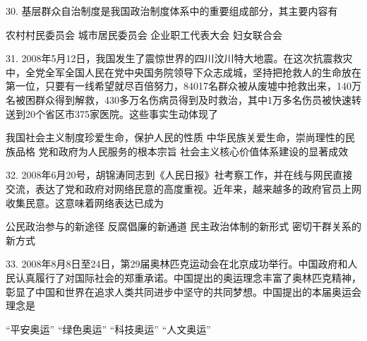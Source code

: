 30. 基层群众自治制度是我国政治制度体系中的重要组成部分，其主要内容有
\begin{choices}
	 农村村民委员会
	 城市居民委员会
	 企业职工代表大会
	 妇女联合会
\end{choices}
31. 2008年5月12日，我国发生了震惊世界的四川汶川特大地震。在这次抗震救灾中，全党全军全国人民在党中央国务院领导下众志成城，坚持把抢救人的生命放在第一位，只要有一线希望就尽百倍努力，84017名群众被从废墟中抢救出来，140万名被困群众得到解救，430多万名伤病员得到及时救治，其中1万多名伤员被快速转送到20个省区市375家医院。这些事实生动体现了
\begin{choices}
	 我国社会主义制度珍爱生命，保护人民的性质
	 中华民族关爱生命，崇尚理性的民族品格
	 党和政府为人民服务的根本宗旨
	 社会主义核心价值体系建设的显著成效
\end{choices}
32. 2008年6月20号，胡锦涛同志到《人民日报》社考察工作，并在线与网民直接交流，表达了党和政府对网络民意的高度重视。近年来，越来越多的政府官员上网收集民意。这意味着网络表达已成为
\begin{choices}
	 公民政治参与的新途径
	 反腐倡廉的新通道
	 民主政治体制的新形式
	 密切干群关系的新方式
\end{choices}
33. 2008年8月8日至24日，第29届奥林匹克运动会在北京成功举行。中国政府和人民认真履行了对国际社会的郑重承诺。中国提出的奥运理念丰富了奥林匹克精神，彰显了中国和世界在追求人类共同进步中坚守的共同梦想。中国提出的本届奥运会理念是
\begin{choices}
	 “平安奥运”
	 “绿色奥运”
	 “科技奥运”
	 “人文奥运”
\end{choices}
\vspace{6pt}
